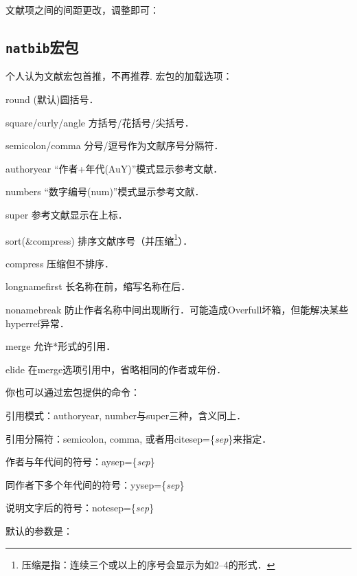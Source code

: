 文献项之间的间距更改，调整即可：
\begin{latex}
\setlength{\bibsep}{1ex}
\end{latex}

\subsection{\texttt{natbib}宏包}
个人认为文献宏包首推，不再推荐. 宏包的加载选项：
\begin{para}
\item[round] (默认)圆括号．
\item[square/curly/angle] 方括号/花括号/尖括号．
\item[semicolon/comma] 分号/逗号作为文献序号分隔符．
\item[authoryear] “作者+年代(AuY)”模式显示参考文献．
\item[numbers] “数字编号(num)”模式显示参考文献．
\item[super] 参考文献显示在上标．
\item[sort(\&compress)] 排序文献序号（并压缩\footnote{压缩是指：连续三个或以上的序号会显示为如2--4的形式．}）．
\item[compress] 压缩但不排序．
\item[longnamefirst] 长名称在前，缩写名称在后．
\item[nonamebreak] 防止作者名称中间出现断行．可能造成Overfull坏箱，但能解决某些hyperref异常．
\item[merge] 允许*形式的引用．
\item[elide] 在merge选项引用中，省略相同的作者或年份．
\end{para}

你也可以通过宏包提供的命令：
\begin{feae}
\item 引用模式：authoryear, number与super三种，含义同上．
\item 引用分隔符：semicolon, comma, 或者用citesep=\{\textit{sep}\}来指定．
\item 作者与年代间的符号：aysep=\{\textit{sep}\}
\item 同作者下多个年代间的符号：yysep=\{\textit{sep}\}
\item 说明文字后的符号：notesep=\{\textit{sep}\}
\end{feae}

默认的参数是：
\begin{latex}
\end{latex}

